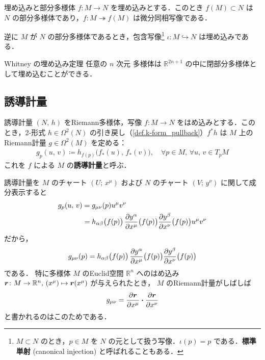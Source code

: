 \documentclass[geometry_main]{subfiles}
\begin{document}
\begin{mytheo}[]{埋め込みと部分多様体}
	$f \colon M \to N$ を埋め込みとする．このとき $f(M) \subset N$ は $N$ の部分多様体であり，$f \colon M \twoheadrightarrow f(M)$ は微分同相写像である．
	
	逆に $M$ が $N$ の部分多様体であるとき，包含写像\footnote{$M \subset N$ のとき，$p \in M$ を $N$ の元として扱う写像．$\iota(p) = p$ である．\textbf{標準単射} (canonical injection) と呼ばれることもある．} $\iota \colon M \hookrightarrow N$ は埋め込みである．
\end{mytheo}

\begin{mytheo}[label=thm.Whitney]{Whitney の埋め込み定理}
	任意の $n$ 次元 \cinfty 多様体は $\mathbb{R}^{2n+1}$ の中に閉部分多様体として埋め込むことができる．
\end{mytheo}

\subsection{誘導計量}

\begin{mydef}[label=def.induced_metric]{誘導計量}
	$(N,\, h)$ をRiemann多様体，\cinfty 写像 $f \colon M \to N$ をはめ込みとする．このとき，2-形式 $h \in \Omega^2(N)$ の引き戻し（\ref{def.k-form_pullback}）$f^*h$ は $M$ 上のRiemann計量 $g \in \Omega^2(M)$ を定める：
	\begin{align}
		g_p (u,\, v) \coloneqq h_{f(p)} \bigl(f_*(u),\, f_*(v)\bigr), \quad \forall p \in M,\, \forall u,\, v \in T_p M
	\end{align}
	これを $f$ による $M$ の\textbf{誘導計量}と呼ぶ．
\end{mydef}

誘導計量を $M$ のチャート $(U;\, x^\mu)$ および $N$ のチャート $(V;\, y^\nu)$ に関して成分表示すると
\begin{align}
	g_p (u,\, v) &= g_{\mu\nu}(p) u^\mu v^\nu\\
	&= h_{\alpha \beta}\bigl( f(p) \bigr)\, \pdv{y^\alpha}{x^\mu}\bigl( f(p) \bigr)\pdv{y^\beta}{x^\nu}\bigl( f(p) \bigr) u^\mu v^\nu
\end{align}
だから，
\begin{align}
	g_{\mu\nu}(p) = h_{\alpha \beta}\bigl( f(p) \bigr)\, \pdv{y^\alpha}{x^\mu}\bigl( f(p) \bigr)\pdv{y^\beta}{x^\nu}\bigl( f(p) \bigr)
\end{align}
である．
特に\cinfty 多様体 $M$ のEuclid空間 $\mathbb{R}^{n}$ へのはめ込み $\vb*{r} \colon M \to \mathbb{R}^{n},\, (x^\mu) \mapsto \vb*{r}(x^\mu)$ が与えられたとき，
$M$ のRiemann計量がしばしば
\begin{align}
	g_{\mu\nu} =  \pdv{\vb*{r}}{x^\mu} \vdot \pdv{\vb*{r}}{x^\nu}
\end{align}
と書かれるのはこのためである．
\end{document}

